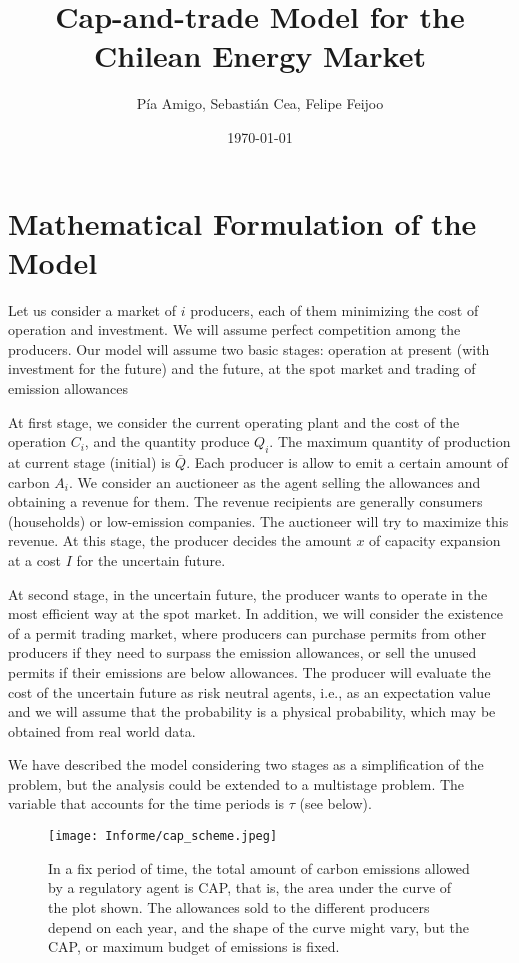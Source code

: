 \documentclass[11pt, letterpaper]{article}
\title{Cap-and-trade Model for the Chilean Energy Market}
\author{P\'ia Amigo, Sebasti\'an Cea, Felipe Feijoo}
\date{\today}
\begin{document}
\maketitle

\section{Mathematical Formulation of the Model}\label{model}

Let us consider a market of $i$ producers, each of them minimizing the cost of operation and investment. We will assume perfect competition among the producers. Our model will assume two basic stages: operation at present (with investment for the future) and the future, at the spot market and trading of emission allowances

\smallskip

At first stage, we consider the current operating plant and the cost of the operation $C_i$, and the quantity produce $Q_i$. The maximum quantity of production at current stage (initial) is $\bar{Q}$. Each producer is allow to emit a certain amount of carbon $A_i$. We consider an auctioneer as the agent selling the allowances and obtaining a revenue for them. The revenue recipients are generally consumers (households) or low-emission companies. The auctioneer will try to maximize this revenue. At this stage, the producer decides the amount $x$ of capacity expansion at a cost $I$ for the uncertain future.
\smallskip

At second stage, in the uncertain future, the producer wants to operate in the most efficient way at the spot market. In addition,  we will consider the existence of a permit trading market, where producers can purchase permits from other producers if they need to surpass the emission allowances, or sell the unused permits if their emissions are below allowances. The producer will evaluate the cost of the uncertain future as risk neutral agents, i.e., as an expectation value and we will assume that the probability is a physical probability, which may be obtained from real world data.
\smallskip

We have described the model considering two stages as a simplification of the problem, but the analysis could be extended to a multistage problem. The variable that accounts for the time periods is $\tau$ (see below).
\smallskip


\begin{figure}[ht!]
 \texttt{[image: Informe/cap\_scheme.jpeg]}
 
 \caption{In a fix period of time, the total amount of carbon emissions allowed by a regulatory agent is CAP, that is, the area under the curve of the plot shown. The allowances sold to the different producers depend on each year, and the shape of the curve might vary, but the CAP, or maximum budget of emissions is fixed. }
 \label{cap-scheme}
\end{figure}
\end{document}
